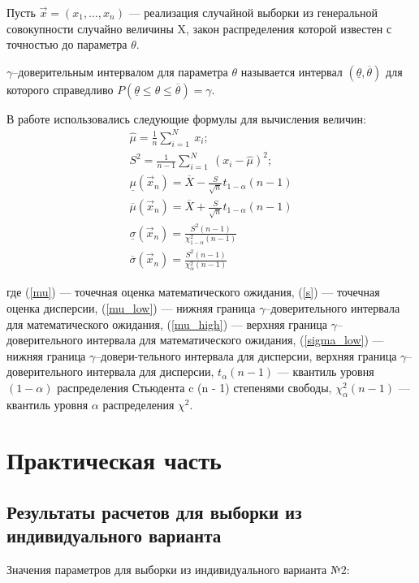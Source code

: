 \documentclass[a4paper, 14pt, unknownkeysallowed]{extreport}
\begin{document}
Пусть $\vec{x} = (x_1, \dots, x_n)$ --- реализация случайной выборки из генеральной совокупности случайно величины X, закон распределения которой известен с точностью до параметра $\theta$.

$\gamma$--доверительным интервалом для параметра $\theta$ называется интервал $(\underline{\theta}, \overline{\theta})$ для которого справедливо $P(\underline{\theta} \leq \theta \leq \overline{\theta}) = \gamma$.

В работе использовались следующие формулы для вычисления величин:
\begin{gather}
	\label{mu}
	\hat\mu = \frac{1}{n}\sum_{i = 1}^{N}~x_i;\\
	\label{s}
	S^2 = \frac{1}{n - 1}\sum_{i = 1}^{N}~(x_i - \hat\mu)^2;\\
	\label{mu_low}
	\underline{\mu}(\vec{x}_n) = \overline{X} - \frac{S}{\sqrt{n}}t_{1-\alpha}(n-1)\\
	\label{mu_high}
	\overline{\mu}(\vec{x}_n) = \overline{X} + \frac{S}{\sqrt{n}}t_{1-\alpha}(n-1)\\
	\label{sigma_low}
	\underline{\sigma}(\vec{x}_n) = \frac{S^2(n-1)}{\chi^2_{1-\alpha}(n-1)}\\
	\label{sigma_high}
	\overline{\sigma}(\vec{x}_n) = \frac{S^2(n-1)}{\chi^2_\alpha(n-1)}
\end{gather}

где (\ref{mu}) --- точечная оценка математического ожидания, (\ref{s}) --- точечная оценка дисперсии, (\ref{mu_low}) --- нижняя граница $\gamma$--доверительного интервала для математического ожидания, (\ref{mu_high}) --- верхняя граница $\gamma$--доверительного интервала для математического ожидания, (\ref{sigma_low}) --- нижняя граница $\gamma$--довери-тельного интервала для дисперсии, верхняя граница $\gamma$--доверительного интервала для дисперсии, $t_{\alpha}(n-1)$ --- квантиль уровня $(1 - \alpha)$ распределения Стьюдента c (n - 1) степенями свободы, $\chi^2_{\alpha}(n-1)$ --- квантиль уровня $\alpha$ распределения $\chi^2$.

\chapter{Практическая часть}
\section{Результаты расчетов для выборки из индивидуального варианта}

Значения параметров для выборки из индивидуального варианта №2:
\end{document}
